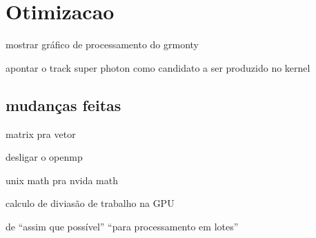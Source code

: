 \chapter{Otimizacao}
\label{cap:otimizacao}

mostrar gráfico de processamento do grmonty

apontar o track super photon como candidato a ser produzido no kernel

\section{mudanças feitas}

matrix pra vetor

desligar o openmp

unix math pra nvida math

calculo de diviasão de trabalho na GPU

de ``assim que possível'' ``para processamento em lotes''
